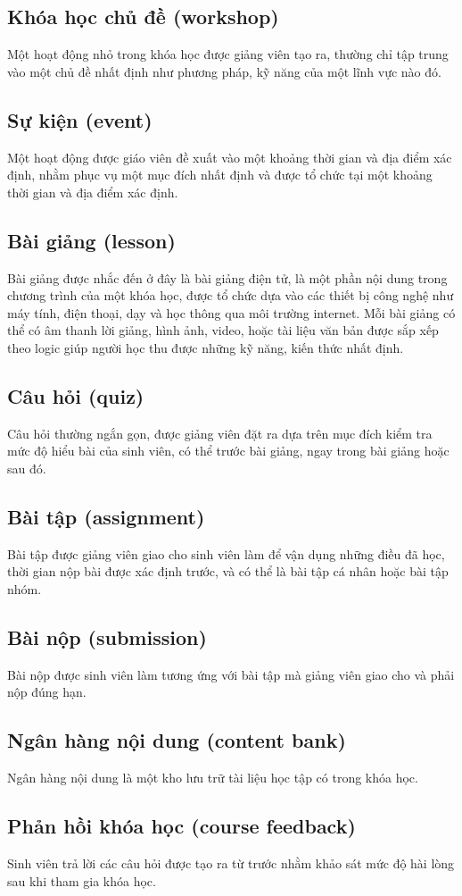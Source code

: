 \documentclass[./../main_file.tex]{subfiles}
\begin{document}
\subsection{Khóa học chủ đề (workshop)}
Một hoạt động nhỏ trong khóa học được giảng viên tạo ra, thường chỉ tập trung vào một chủ đề nhất định như phương pháp, kỹ năng của một lĩnh vực nào đó.

\subsection{Sự kiện (event)}
Một hoạt động được giáo viên đề xuất vào một khoảng thời gian và địa điểm xác định, nhằm phục vụ một mục đích nhất định và được tổ chức tại một khoảng thời gian và địa điểm xác định.

\subsection{Bài giảng (lesson)}
Bài giảng được nhắc đến ở đây là bài giảng điện tử, là một phần nội dung trong chương trình của một khóa học, được tổ chức dựa vào các thiết bị công nghệ như máy tính, điện thoại, dạy và học thông qua môi trường internet. Mỗi bài giảng có thể có âm thanh lời giảng, hình ảnh, video, hoặc tài liệu văn bản được sắp xếp theo logic giúp người học thu được những kỹ năng, kiến thức nhất định.

\subsection{Câu hỏi (quiz)}
Câu hỏi thường ngắn gọn, được giảng viên đặt ra dựa trên mục đích kiểm tra mức độ hiểu bài của sinh viên, có thể trước bài giảng, ngay trong bài giảng hoặc sau đó. 

\subsection{Bài tập (assignment)}
Bài tập được giảng viên giao cho sinh viên làm để vận dụng những điều đã học, thời gian nộp bài được xác định trước, và có thể là bài tập cá nhân hoặc bài tập nhóm.

\subsection{Bài nộp (submission)}
Bài nộp được sinh viên làm tương ứng với bài tập mà giảng viên giao cho và phải nộp đúng hạn.

\subsection{Ngân hàng nội dung (content bank)}
Ngân hàng nội dung là một kho lưu trữ tài liệu học tập có trong khóa học.

\subsection{Phản hồi khóa học (course feedback)}
Sinh viên trả lời các câu hỏi được tạo ra từ trước nhằm khảo sát mức độ hài lòng sau khi tham gia khóa học.
\end{document}

